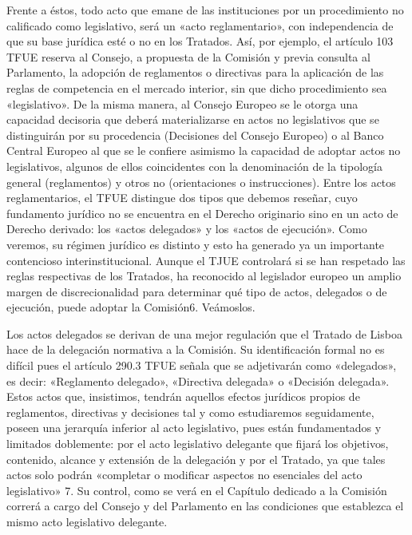 \documentclass[10pt,a4paper]{article}
\begin{document}
Frente a éstos, todo acto que emane de las instituciones por un procedimiento no calificado como legislativo, será un «acto reglamentario», con independencia de que su base jurídica esté o no en los Tratados. Así, por ejemplo, el artículo 103 TFUE reserva al Consejo, a propuesta de la Comisión y previa consulta al Parlamento, la adopción de reglamentos o directivas para la aplicación de las reglas de competencia en el mercado interior, sin que dicho procedimiento sea «legislativo». De la misma manera, al Consejo Europeo se le otorga una capacidad decisoria que deberá materializarse en actos no legislativos que se distinguirán por su procedencia (Decisiones del Consejo Europeo) o al Banco Central Europeo al que se le confiere asimismo la capacidad de adoptar actos no legislativos, algunos de ellos coincidentes con la denominación de la tipología general (reglamentos) y otros no (orientaciones o instrucciones). Entre los actos reglamentarios, el TFUE distingue dos tipos que debemos reseñar, cuyo fundamento jurídico no se encuentra en el Derecho originario sino en un acto de Derecho derivado: los «actos delegados» y los «actos de ejecución». Como veremos, su régimen jurídico es distinto y esto ha generado ya un importante contencioso interinstitucional. Aunque el TJUE controlará si se han respetado las reglas respectivas de los Tratados, ha reconocido al legislador europeo un amplio margen de discrecionalidad para determinar qué tipo de actos, delegados o de ejecución, puede adoptar la Comisión6. Veámoslos.

Los actos delegados se derivan de una mejor regulación que el Tratado de Lisboa hace de la delegación normativa a la Comisión. Su identificación formal no es difícil pues el artículo 290.3 TFUE señala que se adjetivarán como «delegados», es decir: «Reglamento delegado», «Directiva delegada» o «Decisión delegada». Estos actos que, insistimos, tendrán aquellos efectos jurídicos propios de reglamentos, directivas y decisiones tal y como estudiaremos seguidamente, poseen una jerarquía inferior al acto legislativo, pues están fundamentados y limitados doblemente: por el acto legislativo delegante que fijará los objetivos, contenido, alcance y extensión de la delegación y por el Tratado, ya que tales actos solo podrán «completar o modificar aspectos no esenciales del acto legislativo» 7. Su control, como se verá en el Capítulo dedicado a la Comisión correrá a cargo del Consejo y del Parlamento en las condiciones que establezca el mismo acto legislativo delegante. 
\end{document}
